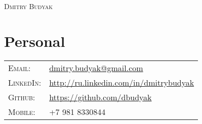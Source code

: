 \documentclass[a4paper,11pt]{article}
\begin{document}
\pagestyle{empty}
\par{\centering
	\Huge \textsc{Dmitry Budyak}
	}\bigskip\par

\section{Personal}
	\begin{tabular}{ll}
	\textsc{Email:}     	& \href{mailto:dmitry.budyak@gmail.com}{dmitry.budyak@gmail.com} \\
	\textsc{LinkedIn:} 	& \href{http://ru.linkedin.com/in/dmitrybudyak}{http://ru.linkedin.com/in/dmitrybudyak} \\
	\textsc{Github:}	& \href{https://github.com/dbudyak}{https://github.com/dbudyak} \\
	\textsc{Mobile:}     	& +7 981 8330844
	\end{tabular}
\end{document}
